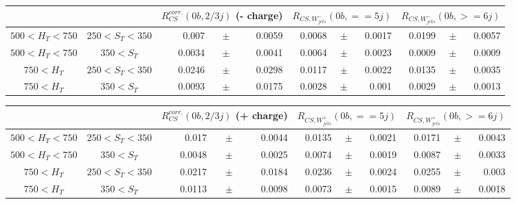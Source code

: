 \documentclass[12pt]{paper}
\begin{document}
\begin{sidewaystable}[ht]
\begin{center}
\begin{tabular}{cc|rrr|rrr|rrr}
& & \multicolumn{3}{c|}{$R^{corr.}_{CS}(0b,2/3j)$ (- charge)}&\multicolumn{3}{c|}{$R_{CS,W^{-}_{jets}}(0b,==5j)$}&\multicolumn{3}{c}{$R_{CS,W^{-}_{jets}}(0b,>=6j)$}\\\hline
$500< H_{T}< 750$&$250< S_{T}< 350$ & 0.007&$\pm$&0.0059 & 0.0068&$\pm$&0.0017 & 0.0199&$\pm$&0.0057\\
$500< H_{T}< 750$&$350< S_{T}$ & 0.0034&$\pm$&0.0041 & 0.0064&$\pm$&0.0023 & 0.0009&$\pm$&0.0009\\
$750< H_{T}$&$250< S_{T}< 350$ & 0.0246&$\pm$&0.0298 & 0.0117&$\pm$&0.0022 & 0.0135&$\pm$&0.0035\\
$750< H_{T}$&$350< S_{T}$ & 0.0093&$\pm$&0.0175 & 0.0028&$\pm$&0.001 & 0.0029&$\pm$&0.0013\\
\end{tabular}
\end{center}
\end{sidewaystable}

\begin{sidewaystable}[ht]
\begin{center}
\begin{tabular}{cc|rrr|rrr|rrr}
& & \multicolumn{3}{c|}{$R^{corr.}_{CS}(0b,2/3j)$ (+ charge)}&\multicolumn{3}{c|}{$R_{CS,W^{+}_{jets}}(0b,==5j)$}&\multicolumn{3}{c}{$R_{CS,W^{+}_{jets}}(0b,>=6j)$}\\\hline
$500< H_{T}< 750$&$250< S_{T}< 350$ & 0.017&$\pm$&0.0044 & 0.0135&$\pm$&0.0021 & 0.0171&$\pm$&0.0043\\
$500< H_{T}< 750$&$350< S_{T}$ & 0.0048&$\pm$&0.0025 & 0.0074&$\pm$&0.0019 & 0.0087&$\pm$&0.0033\\
$750< H_{T}$&$250< S_{T}< 350$ & 0.0217&$\pm$&0.0184 & 0.0236&$\pm$&0.0024 & 0.0255&$\pm$&0.003\\
$750< H_{T}$&$350< S_{T}$ & 0.0113&$\pm$&0.0098 & 0.0073&$\pm$&0.0015 & 0.0089&$\pm$&0.0018\\
\end{tabular}
\end{center}
\end{sidewaystable}
\end{document}
